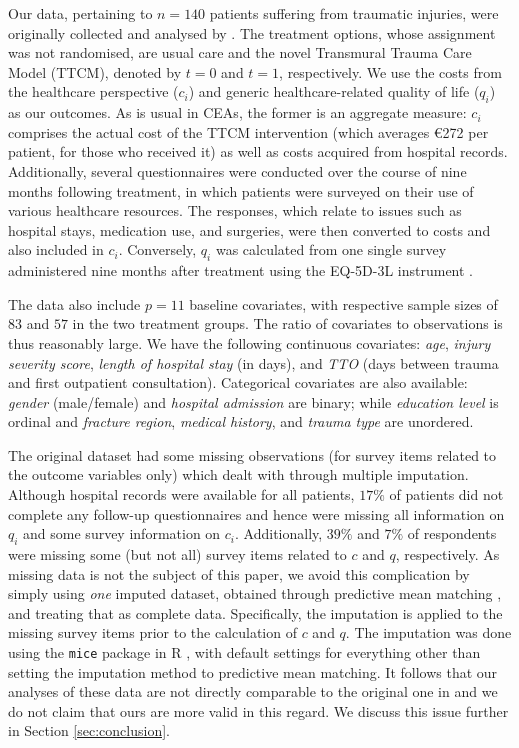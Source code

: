 \documentclass[aoas,preprint]{imsart}
\theoremstyle{plain}
\theoremstyle{definition}
\theoremstyle{remark}
\begin{document}
Our data, pertaining to $n=140$ patients suffering from traumatic injuries, were originally collected and analysed by \citet{wiertsema2019cost}. The treatment options, whose assignment was not randomised, are usual care and the novel Transmural Trauma Care Model (TTCM), denoted by $t=0$ and $t=1$, respectively. 
We use the costs from the healthcare perspective ($c_i$) and generic healthcare-related quality of life ($q_i$) as our outcomes. As is usual in CEAs, the former is an aggregate measure: $c_i$ comprises the actual cost of the TTCM intervention (which averages €272 per patient, for those who received it) as well as costs acquired from hospital records. Additionally, several questionnaires were conducted over the course of nine months following treatment, in which patients were surveyed on their use of various healthcare resources. The responses, which relate to issues such as hospital stays, medication use, and surgeries, were then converted to costs and also included in $c_i$. Conversely, $q_i$ was calculated from one single survey administered nine months after treatment using the EQ-5D-3L instrument \citep{lamers2006dutch}.

The data also include $p=11$ baseline covariates, with respective sample sizes of $83$ and $57$ in the two treatment groups. The ratio of covariates to observations is thus reasonably large. We have the following continuous covariates: \textit{age}, \textit{injury severity score}, \textit{length of hospital stay} (in days), and \textit{TTO} (days between trauma and first outpatient consultation). Categorical covariates are also available: \textit{gender} (male/female) and \textit{hospital admission} are binary;  while \textit{education level} is ordinal and \textit{fracture region}, \textit{medical history}, and \textit{trauma type} are unordered.

The original dataset had some missing observations (for survey items related to the outcome variables only) which \citet{wiertsema2019cost} dealt with through multiple imputation. Although hospital records were available for all patients, $17\%$ of patients did not complete any follow-up questionnaires and hence were missing all information on $q_i$ and some survey information on $c_i$. Additionally, $39\%$ and $7\%$ of respondents were missing some (but not all) survey items related to $c$ and $q$, respectively. As missing data is not the subject of this paper, we avoid this complication by simply using \textit{one} imputed dataset, obtained through predictive mean matching \citep{vink2014predictive}, and treating that as complete data. Specifically, the imputation is applied to the missing survey items prior to the calculation of $c$ and $q$. The imputation was done using the \texttt{mice} package in \textsf{R} \citep{van2011mice}, with default settings for everything other than setting the imputation method to predictive mean matching.
It follows that our analyses of these data are not directly comparable to the original one in \citep{wiertsema2019cost} and we do not claim that ours are more valid in this regard. We discuss this issue further in Section \ref{sec:conclusion}.
\end{document}

